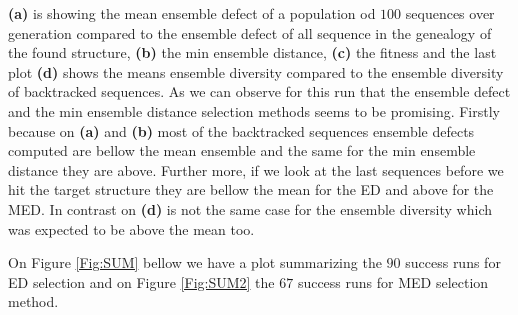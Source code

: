 \documentclass[english,12pt,a4paper]{article}
\theoremstyle{definition}
\begin{document}
\textbf{(a)} is showing the mean ensemble defect of a population od $100$  sequences over generation compared to the ensemble defect of all sequence in the genealogy of the found structure,   \textbf{(b)} the min ensemble distance, \textbf{(c)}  the  fitness and the last plot \textbf{(d)} shows the means ensemble diversity compared to the ensemble diversity of backtracked sequences. As we can observe for this run that the ensemble defect and the min ensemble distance selection methods seems to be promising. Firstly because on \textbf{(a)} and  \textbf{(b)} most of the backtracked sequences ensemble defects computed are bellow the mean ensemble and the same for the min ensemble distance they are above. Further more, if we look at the last sequences before we hit the target structure they are bellow the mean for the ED and above for the MED. In contrast on  \textbf{(d)} is not the same case for the ensemble diversity which was expected to be above the mean too. 

On Figure \ref{Fig:SUM} bellow we have a plot summarizing the $90$ success runs for ED selection and on Figure \ref{Fig:SUM2} the $67$ success runs for MED selection method.  
\end{document}
